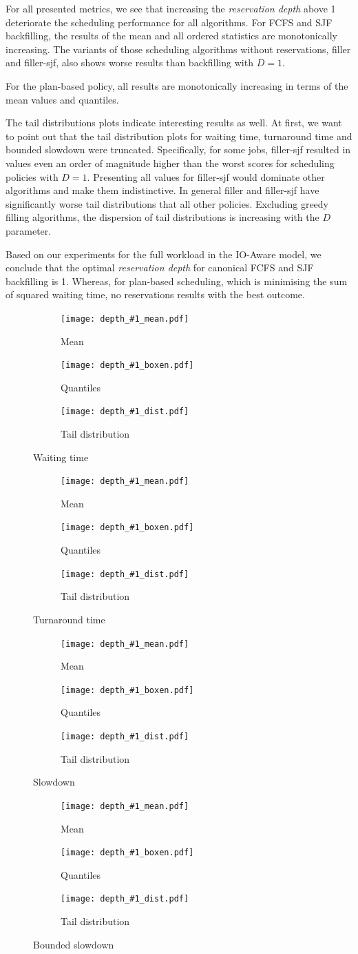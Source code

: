 \documentclass[thesis-en.tex]{subfiles}
\newcommand{\depthplot}[2]{
\begin{figure}[p] 
  \begin{subfigure}{\linewidth}
    \centering
    \texttt{[image: depth\_\#1\_mean.pdf]}
    \caption{Mean} 
    \label{fig:depth_#1_mean} 
  \end{subfigure}
  \hfill
  \begin{subfigure}{\linewidth}
    \centering
    \texttt{[image: depth\_\#1\_boxen.pdf]} 
    \caption{Quantiles} 
    \label{fig:depth_#1_boxen}
  \end{subfigure} 
  \begin{subfigure}{\linewidth}
    \centering
    \texttt{[image: depth\_\#1\_dist.pdf]} 
    \caption{Tail distribution} 
    \label{fig:depth_#1_dist} 
  \end{subfigure}
  \caption{#2}
  \label{fig:depth_#1}
\end{figure}
}
\begin{document}
For all presented metrics, we see that increasing the \emph{reservation depth} above 1 deteriorate the scheduling performance for all algorithms. For FCFS and SJF backfilling, the results of the mean and all ordered statistics are monotonically increasing. The variants of those scheduling algorithms without reservations, filler and filler-sjf, also shows worse results than backfilling with $D=1$. 

For the plan-based policy, all results are monotonically increasing in terms of the mean values and quantiles.

The tail distributions plots indicate interesting results as well. At first, we want to point out that the tail distribution plots for waiting time, turnaround time and bounded slowdown were truncated. Specifically, for some jobs, filler-sjf resulted in values even an order of magnitude higher than the worst scores for scheduling policies with $D=1$. Presenting all values for filler-sjf would dominate other algorithms and make them  indistinctive. In general filler and filler-sjf have significantly worse tail distributions that all other policies. Excluding greedy filling algorithms, the dispersion of tail distributions is increasing with the $D$ parameter.

Based on our experiments for the full workload in the IO-Aware model, we conclude that the optimal \emph{reservation depth} for canonical FCFS and SJF backfilling is 1. Whereas, for plan-based scheduling, which is minimising the sum of squared waiting time, no reservations results with the best outcome.

\depthplot{waiting-time}{Waiting time}
\depthplot{turnaround-time}{Turnaround time}
\depthplot{slowdown}{Slowdown}
\depthplot{bounded-slowdown}{Bounded slowdown}
\end{document}

